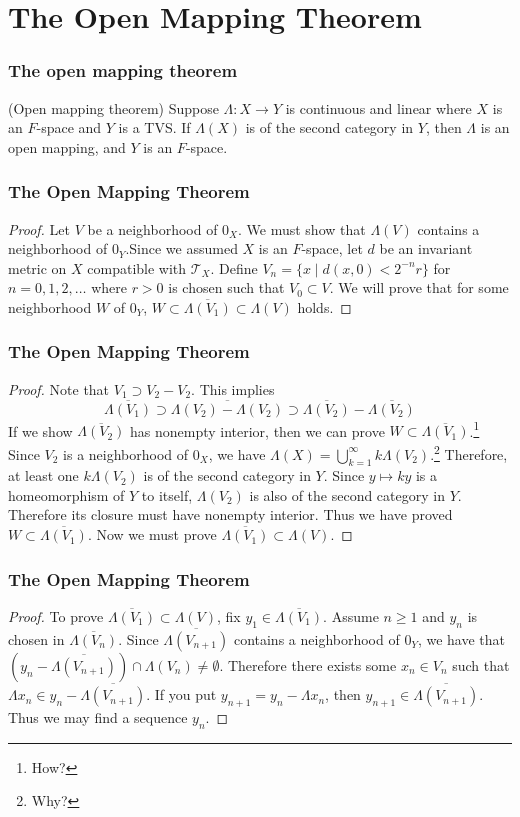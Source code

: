 \documentclass{beamer}
\begin{document}
\section{The Open Mapping Theorem}
\begin{frame}
\frametitle{The open mapping theorem}
\begin{theorem} (Open mapping theorem) Suppose $\Lambda : X \to Y$ is continuous and linear where $X$ is an $F$-space and $Y$ is a TVS. If $\Lambda(X)$ is of the second category in $Y$, then $\Lambda$ is an open mapping, and $Y$ is an $F$-space.
\end{theorem}
\end{frame}
\begin{frame}
\frametitle{The Open Mapping Theorem}
\begin{proof}\renewcommand{\qedsymbol}{}
    Let $V$ be a neighborhood of $0_X$. We must show that $\Lambda(V)$ contains a neighborhood of $0_Y$.\newline Since we assumed $X$ is an $F$-space, let $d$ be an invariant metric on $X$ compatible with $\mathcal{T}_X$. Define $V_n = \{x \mid d(x,0)<2^{-n}r\}$ for $n = 0,1,2,\ldots$ where $r>0$ is chosen such that $V_0 \subset V$. We will prove that for some neighborhood $W$ of $0_Y$, $W \subset \overline{\Lambda(V_1)}\subset\Lambda(V)$ holds.
\end{proof}
\end{frame}
\begin{frame}
\frametitle{The Open Mapping Theorem}
\begin{proof}\renewcommand{\qedsymbol}{}
    Note that $V_1 \supset V_2 - V_2$. This implies \[\overline{\Lambda(V_1)}\supset\overline{\Lambda(V_2)-\Lambda(V_2)}\supset\overline{\Lambda(V_2)}-\overline{\Lambda(V_2)}\] If we show $\overline{\Lambda(V_2)}$ has nonempty interior, then we can prove $W \subset \overline{\Lambda(V_1)}$.\footnote{How?} Since $V_2$ is a neighborhood of $0_X$, we have $\Lambda(X) = \bigcup_{k=1}^\infty k\Lambda(V_2)$.\footnote{Why?} Therefore, at least one $k\Lambda(V_2)$ is of the second category in $Y$. Since $y \mapsto ky$ is a homeomorphism of $Y$ to itself, $\Lambda(V_2)$ is also of the second category in $Y$. Therefore its closure must have nonempty interior. Thus we have proved $W \subset \overline{\Lambda(V_1)}$. Now we must prove $\overline{\Lambda(V_1)} \subset \Lambda(V)$.
\end{proof}
\end{frame}
\begin{frame}
\frametitle{The Open Mapping Theorem}
\begin{proof}\renewcommand{\qedsymbol}{}
    To prove $\overline{\Lambda(V_1)}\subset\Lambda(V)$, fix $y_1 \in \overline{\Lambda(V_1)}$. Assume $n \geq 1$ and $y_n$ is chosen in $\overline{\Lambda(V_n)}$. Since $\overline{\Lambda(V_{n+1})}$ contains a neighborhood of $0_Y$, we have that $(y_n - \overline{\Lambda(V_{n+1})}) \cap \Lambda(V_n) \neq \emptyset$. Therefore there exists some $x_n \in V_n$ such that $\Lambda x_n \in y_n - \overline{\Lambda(V_{n+1})}$. If you put $y_{n+1} = y_n - \Lambda x_n$, then $y_{n+1} \in \overline{\Lambda(V_{n+1})}$. Thus we may find a sequence $y_n$.
\end{proof}
\end{frame}
\end{document}
